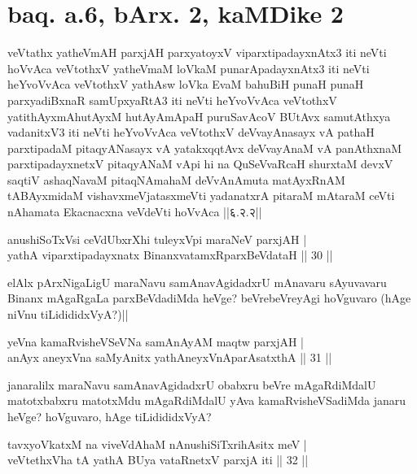 \section*{baq. a.6, bArx. 2, kaMDike 2}

\begin{shl}
veVtathx yatheVmAH parxjAH parxyatoyxV viparxtipadayxnAtx3 iti neVti hoVvAca veVtothxV yatheVmaM loVkaM punarApadayxnAtx3 iti neVti heYvoVvAca veVtothxV yathAsw loVka EvaM bahuBiH punaH punaH parxyadiBxnaR samUpxyaRtA3 iti neVti heYvoVvAca veVtothxV yatithAyxmAhutAyxM hutAyAmApaH puruSavAcoV BUtAvx samutAthxya vadanitxV3 iti neVti heYvoVvAca veVtothxV deVvayAnasayx vA pathaH parxtipadaM pitaqyANasayx vA yatakxqqtAvx deVvayAnaM vA panAthxnaM parxtipadayxnetxV pitaqyANaM vApi hi na QuSeVvaRcaH shurxtaM devxV saqtiV ashaqNavaM pitaqNAmahaM deVvAnAmuta matAyxRnAM tABAyxmidaM vishavxmeVjatasxmeVti yadanatxrA pitaraM mAtaraM ceVti nAhamata Ekacnacxna veVdeVti hoVvAca ||६.२.२||
\end{shl}


\begin{shl}
anushiSoTxV\s si ceVdUbxrXhi tuleyxV\s pi maraNeV parxjAH | \\
yathA viparxtipadayxnatx BinanxvatamxRparxBeVdataH \hfill|| 30 || 
\end{shl}

\begin{artha}
elAlx pArxNigaLigU maraNavu samAnavAgidadxrU mAnavaru sAyuvavaru 
Binanx mAgaRgaLa parxBeVdadiMda heVge? beVrebeVreyAgi hoVguvaro (hAge 
niVnu tiLidididxVyA?)||
\end{artha}


\begin{shl}
yeVna kamaRvisheVSeVNa samAnAyAM maqtw parxjAH | \\
anAyx aneyxVna saMyAnitx yathA\s neyxVnAparAsatxthA \hfill|| 31 || 
\end{shl}

\begin{artha}
janaralilx maraNavu samAnavAgidadxrU obabxru beVre mAgaRdiMdalU 
matotxbabxru matotxMdu mAgaRdiMdalU yAva kamaRvisheVSadiMda janaru 
heVge? hoVguvaro, hAge tiLidididxVyA?
\end{artha}


\begin{shl}
tavxyoVkatxM na viveVdAhaM nAnushiSiTxrihAsitx meV | \\
veVtethxVha tA yathA BUya vataRnetxV parxjA iti  \hfill|| 32 || 
\end{shl}

